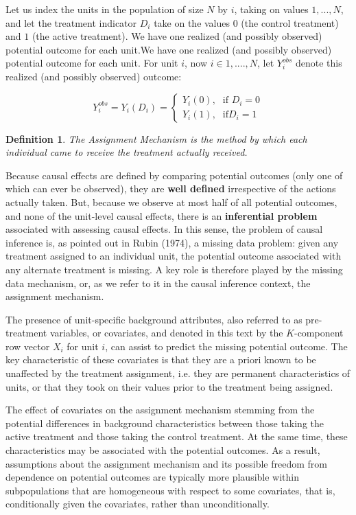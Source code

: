 \documentclass[12pt]{article}
\theoremstyle{definition}
\newtheorem{definition}{Definition}[section]
\begin{document}
Let us index the units in the population of size $N$ by $i$, taking on values $1, ... , N$, and let the treatment indicator $D_i$ take on the values $0$ (the control treatment) and $1$ (the active treatment). We have one realized (and possibly observed) potential outcome for each unit.We have one realized (and possibly observed) potential outcome for each unit. For unit $i$, now $i\in{1,....,N}$, let $Y_{i}^{obs}$ denote this realized (and possibly observed) outcome: 

\[ Y_{i}^{obs} = Y_i(D_i) = \begin{cases} \mbox{$Y_i(0)$,} & \mbox{if } D_i = 0 \\ \mbox{$Y_i(1)$,} & \mbox{if} D_i = 1\end{cases} \]

\begin{definition}\textit{The Assignment Mechanism is the method by which each individual came to receive the treatment actually received. }
\end{definition}

Because causal effects are defined by comparing potential outcomes (only one of which can ever be observed), they are \textbf{well defined} irrespective of the actions actually taken. But, because we observe at most half of all potential outcomes, and none of the unit-level causal effects, there is an \textbf{inferential problem} associated with assessing causal effects. In this sense, the problem of causal inference is, as pointed out in Rubin (1974), a missing data problem: given any treatment assigned to an individual unit, the potential outcome associated with any alternate treatment is missing. A key role is therefore played by the missing data mechanism, or, as we refer to it in the causal inference context, the assignment mechanism.

The presence of unit-specific background attributes, also referred to as pre-treatment variables, or covariates, and denoted in this text by the $K$-component row vector $X_i$ for unit $i$, can assist to predict the missing potential outcome. The key characteristic of these covariates is that they are a priori known to be unaffected by the treatment assignment, i.e. they are permanent characteristics of units, or that they took on their values prior to the treatment being assigned. 

The effect of covariates on the assignment mechanism stemming from the potential differences in background characteristics between those taking the active treatment and those taking the control treatment. At the same time, these characteristics may be associated with the potential outcomes. As a result, assumptions about the assignment mechanism and its possible freedom from dependence on potential outcomes are typically more plausible within subpopulations that are homogeneous with respect to some covariates, that is, conditionally given the covariates, rather than unconditionally.
\end{document}
